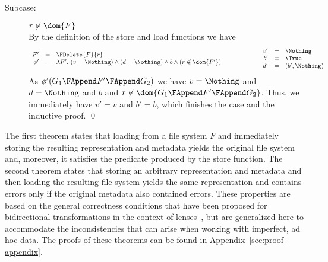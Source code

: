 {\begin{description}
\begin{description}
\item[Subcase:] $r \not\in \dom{F}$\\[1ex]
%
By the definition of the store and load functions we have
\[
\begin{array}{rcl}
F' &=& \FDelete{F}{r}\\
\phi' &=& \lambda F'.~(v = \Nothing) \wedge (d = \Nothing) \wedge b \wedge (r \not\in \dom{F'})\\
\end{array}\hspace*{2cm}\begin{array}{rcl}
v' &=& \Nothing\\
b' &=& \True\\
d' &=& (b',\Nothing)\\
\end{array}
\]
As $\phi'(G_1 \FAppend F' \FAppend G_2)$ we have $v = \Nothing$ and $d
= \Nothing$ and $b$ and $r \not\in \dom{G_1 \FAppend F' \FAppend
  G_2}$. Thus, we immediately have $v' = v$ and $b' = b$, which finishes the case and
the inductive proof. \hfill \qed
\end{description}
\end{description}}

\smallskip

\noindent The first theorem states that loading from a file system $F$
and immediately storing the resulting representation and metadata
yields the original file system and, moreover, it satisfies the
predicate produced by the store function. The second theorem states
that storing an arbitrary representation and metadata and then loading
the resulting file system yields the same representation and contains
errors only if the original metadata also contained errors. These
properties are based on the general correctness conditions that have
been proposed for bidirectional transformations in the context of
lenses~\cite{lenses}, but are generalized here to accommodate the
inconsistencies that can arise when working with imperfect, ad hoc
data. The proofs of these theorems can be found in
Appendix~\ref{sec:proof-appendix}. 

